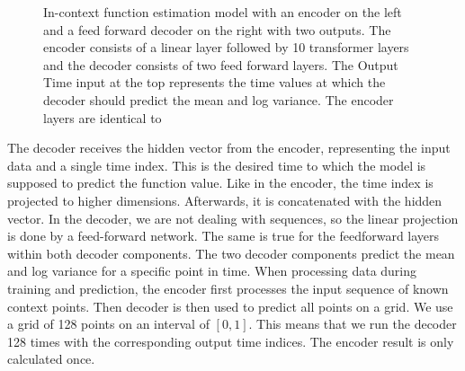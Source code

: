 \begin{figure}
	\centering
	\caption{In-context function estimation model with an encoder on the left and a feed forward decoder on the right with two outputs. The encoder consists of a linear layer followed by 10 transformer layers and the decoder consists of two feed forward layers. The Output Time input at the top represents the time values at which the decoder should predict the mean and log variance. The encoder layers are identical to \citet{vaswani2017attention}}
	\label{fig:model}
\end{figure}

The decoder receives the hidden vector from the encoder, representing the input data and a single time index. This is the desired time to which the model is supposed to predict the function value. Like in the encoder, the time index is projected to higher dimensions. Afterwards, it is concatenated with the hidden vector. In the decoder, we are not dealing with sequences, so the linear projection is done by a feed-forward network. The same is true for the feedforward layers within both decoder components. The two decoder components predict the mean and log variance for a specific point in time. When processing data during training and prediction, the encoder first processes the input sequence of known context points. Then decoder is then used to predict all points on a grid. We use a grid of 128 points on an interval of $[0,1]$. This means that we run the decoder 128 times with the corresponding output time indices. The encoder result is only calculated once. 

